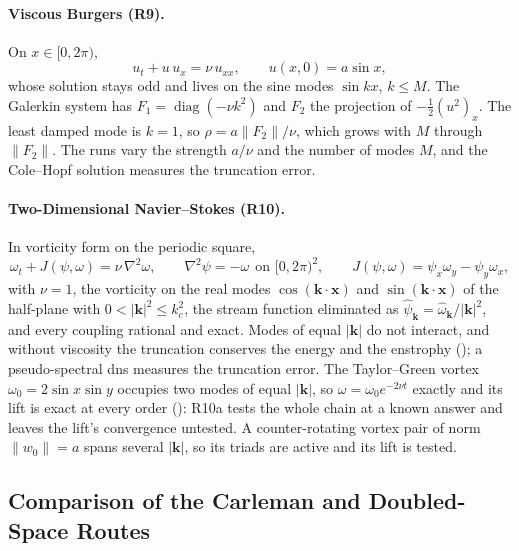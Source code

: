 \paragraph{Viscous Burgers (R9).} On $x\in[0,2\pi)$,
\begin{equation}
    u_t+u\,u_x=\nu\,u_{xx},\qquad u(x,0)=a\sin x,
    \label{eq:burgers}
\end{equation}
whose solution stays odd and lives on the sine modes $\sin kx$, $k\le M$. The Galerkin system has $F_1=\operatorname{diag}(-\nu k^2)$ and $F_2$ the projection of $-\tfrac12(u^2)_x$. The least damped mode is $k=1$, so $\rho=a\|F_2\|/\nu$, which grows with $M$ through $\|F_2\|$. The runs vary the strength $a/\nu$ and the number of modes $M$, and the Cole--Hopf solution \cite{hopf1950burgers,cole1951burgers} measures the truncation error.

\paragraph{Two-Dimensional Navier--Stokes (R10).} In vorticity form on the periodic square,
\begin{equation}
    \omega_t+J(\psi,\omega)=\nu\,\nabla^2\omega,
    \qquad
    \nabla^2\psi=-\omega\ \ \text{on }[0,2\pi)^2,
    \qquad
    J(\psi,\omega)=\psi_x\omega_y-\psi_y\omega_x,
    \label{eq:navier-stokes}
\end{equation}
with $\nu=1$, the vorticity on the real modes $\cos(\mathbf k\cdot\mathbf x)$ and $\sin(\mathbf k\cdot\mathbf x)$ of the half-plane with $0<|\mathbf k|^2\le k_c^2$, the stream function eliminated as $\hat\psi_{\mathbf k}=\hat\omega_{\mathbf k}/|\mathbf k|^2$, and every coupling rational and exact. Modes of equal $|\mathbf k|$ do not interact, and without viscosity the truncation conserves the energy and the enstrophy (); a pseudo-spectral \gls{dns} measures the truncation error. The Taylor--Green vortex $\omega_0=2\sin x\sin y$ \cite{taylorgreen1937} occupies two modes of equal $|\mathbf k|$, so $\omega=\omega_0e^{-2\nu t}$ exactly and its lift is exact at every order (): R10a tests the whole chain at a known answer and leaves the lift's convergence untested. A counter-rotating vortex pair of norm $\|w_0\|=a$ spans several $|\mathbf k|$, so its triads are active and its lift is tested.

\subsection{Comparison of the Carleman and Doubled-Space Routes}
\label{sec:prep-vs-proj}

